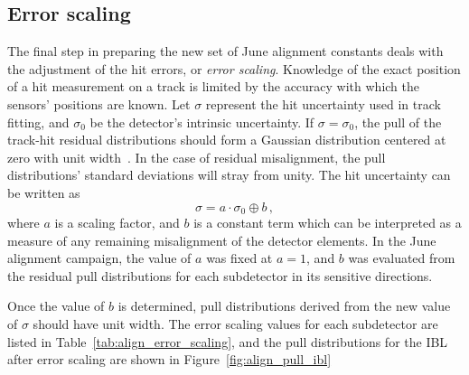 \subsection{Error scaling}\label{align:2015_results_error_scaling}
The final step in preparing the new set of June alignment constants deals with the adjustment of the hit errors, or \emph{error scaling}.
Knowledge of the exact position of a hit measurement on a track is limited by the accuracy with which the sensors' positions are known.
Let $\sigma$ represent the hit uncertainty used in track fitting, and $\sigma_0$ be the detector's intrinsic uncertainty.
If $\sigma = \sigma_0$, the pull of the track-hit residual distributions should form a Gaussian distribution centered at zero with unit width~\cite{2011.alignment-7tev}.
In the case of residual misalignment, the pull distributions' standard deviations will stray from unity.
The hit uncertainty can be written as
\begin{equation}
  \sigma = a\cdot\sigma_0\oplus b\,,
  \label{eq:align_error_scaling}
\end{equation}
where $a$ is a scaling factor, and $b$ is a constant term which can be interpreted as a measure of any remaining misalignment of the detector elements.
In the June alignment campaign, the value of $a$ was fixed at $a=1$, and $b$ was evaluated from the residual pull distributions for each subdetector in its sensitive directions.

Once the value of $b$ is determined, pull distributions derived from the new value of $\sigma$ should have unit width.
The error scaling values for each subdetector are listed in Table~\ref{tab:align_error_scaling}, and the pull distributions for the IBL after error scaling are shown in Figure~\ref{fig:align_pull_ibl}

